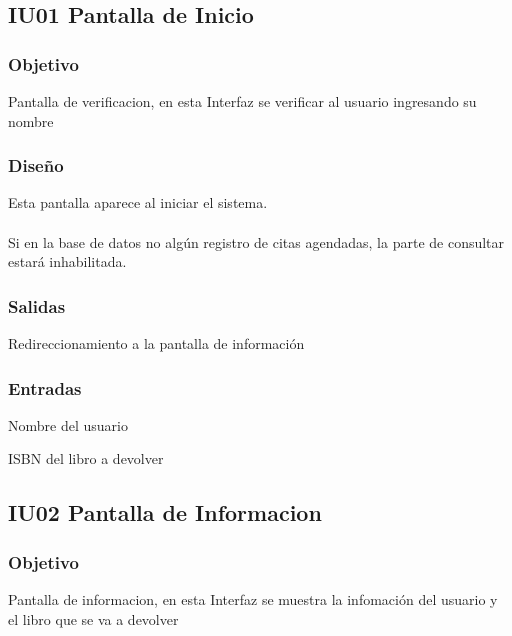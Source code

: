 \newpage
\subsection{IU01 Pantalla de Inicio}

\subsubsection{Objetivo}
	Pantalla de verificacion, en esta Interfaz se verificar al usuario ingresando su nombre  

\subsubsection{Diseño}
	Esta pantalla aparece al iniciar el sistema.  \\\\
	Si en la base de datos no algún registro de citas agendadas, la parte de consultar estará inhabilitada. 


\subsubsection{Salidas}
	\begin{Citemize}
		\item Redireccionamiento a la pantalla de información  
	\end{Citemize}
	
\subsubsection{Entradas}
	\begin{Citemize}
		\item Nombre del usuario 
		\item ISBN del libro a devolver
	\end{Citemize}

\subsection{IU02 Pantalla de Informacion}

\subsubsection{Objetivo}
	Pantalla de informacion, en esta Interfaz se muestra la infomación del usuario y el libro que se va a devolver  

